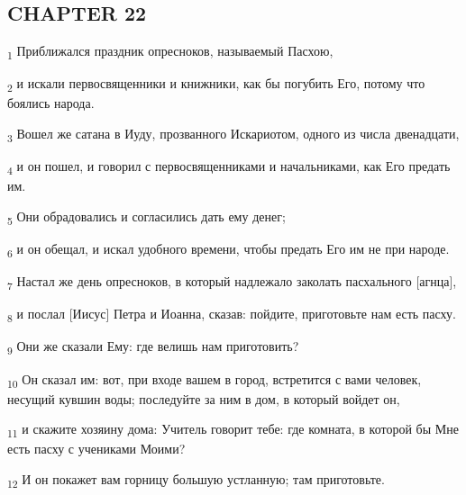 \subsection{CHAPTER 22}
\begin{tcolorbox}
\textsubscript{1} Приближался праздник опресноков, называемый Пасхою,
\end{tcolorbox}
\begin{tcolorbox}
\textsubscript{2} и искали первосвященники и книжники, как бы погубить Его, потому что боялись народа.
\end{tcolorbox}
\begin{tcolorbox}
\textsubscript{3} Вошел же сатана в Иуду, прозванного Искариотом, одного из числа двенадцати,
\end{tcolorbox}
\begin{tcolorbox}
\textsubscript{4} и он пошел, и говорил с первосвященниками и начальниками, как Его предать им.
\end{tcolorbox}
\begin{tcolorbox}
\textsubscript{5} Они обрадовались и согласились дать ему денег;
\end{tcolorbox}
\begin{tcolorbox}
\textsubscript{6} и он обещал, и искал удобного времени, чтобы предать Его им не при народе.
\end{tcolorbox}
\begin{tcolorbox}
\textsubscript{7} Настал же день опресноков, в который надлежало заколать пасхального [агнца],
\end{tcolorbox}
\begin{tcolorbox}
\textsubscript{8} и послал [Иисус] Петра и Иоанна, сказав: пойдите, приготовьте нам есть пасху.
\end{tcolorbox}
\begin{tcolorbox}
\textsubscript{9} Они же сказали Ему: где велишь нам приготовить?
\end{tcolorbox}
\begin{tcolorbox}
\textsubscript{10} Он сказал им: вот, при входе вашем в город, встретится с вами человек, несущий кувшин воды; последуйте за ним в дом, в который войдет он,
\end{tcolorbox}
\begin{tcolorbox}
\textsubscript{11} и скажите хозяину дома: Учитель говорит тебе: где комната, в которой бы Мне есть пасху с учениками Моими?
\end{tcolorbox}
\begin{tcolorbox}
\textsubscript{12} И он покажет вам горницу большую устланную; там приготовьте.
\end{tcolorbox}
